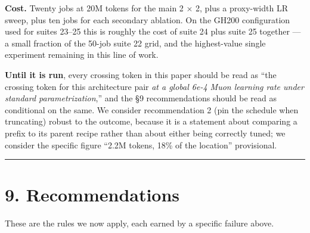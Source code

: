 \textbf{Cost.} Twenty jobs at 20M tokens for the main 2 $\times$ 2, plus a proxy-width LR sweep, plus ten jobs
for each secondary ablation. On the GH200 configuration used for suites 23--25 this is roughly the
cost of suite 24 plus suite 25 together --- a small fraction of the 50-job suite 22 grid, and the
highest-value single experiment remaining in this line of work.

\textbf{Until it is run}, every crossing token in this paper should be read as ``the crossing token for
this architecture pair \emph{at a global 6e-4 Muon learning rate under standard parametrization},'' and
the \S9 recommendations should be read as conditional on the same. We consider recommendation 2
(pin the schedule when truncating) robust to the outcome, because it is a statement about
comparing a prefix to its parent recipe rather than about either being correctly tuned; we
consider the specific figure ``2.2M tokens, 18\% of the location'' provisional.

\begin{center}\rule{0.5\linewidth}{0.5pt}\end{center}

\section{9. Recommendations}\label{recommendations}

These are the rules we now apply, each earned by a specific failure above.


